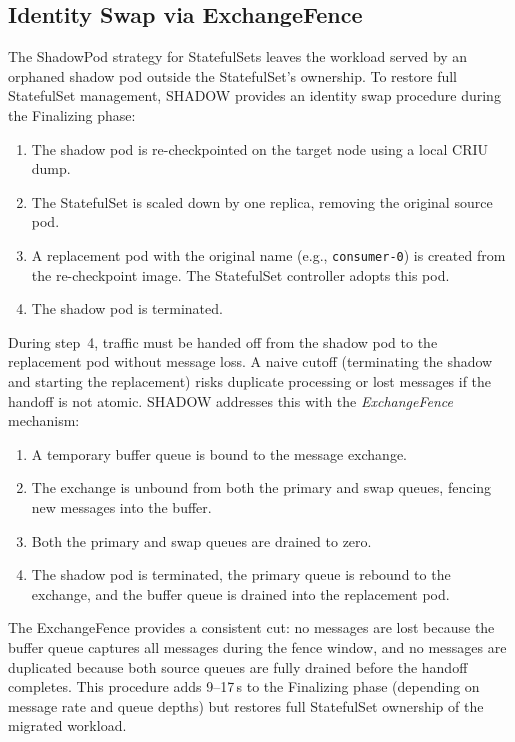 \documentclass[conference]{IEEEtran}
\begin{document}
\subsection{Identity Swap via ExchangeFence}
\label{sec:identity-swap}

The ShadowPod strategy for StatefulSets leaves the workload served by an orphaned shadow pod outside the StatefulSet's ownership. To restore full StatefulSet management, SHADOW provides an identity swap procedure during the Finalizing phase:

\begin{enumerate}
\item The shadow pod is re-checkpointed on the target node using a local CRIU dump.
\item The StatefulSet is scaled down by one replica, removing the original source pod.
\item A replacement pod with the original name (e.g., \texttt{consumer-0}) is created from the re-checkpoint image. The StatefulSet controller adopts this pod.
\item The shadow pod is terminated.
\end{enumerate}

During step~4, traffic must be handed off from the shadow pod to the replacement pod without message loss. A naive cutoff (terminating the shadow and starting the replacement) risks duplicate processing or lost messages if the handoff is not atomic. SHADOW addresses this with the \textit{ExchangeFence} mechanism:

\begin{enumerate}
\item A temporary buffer queue is bound to the message exchange.
\item The exchange is unbound from both the primary and swap queues, fencing new messages into the buffer.
\item Both the primary and swap queues are drained to zero.
\item The shadow pod is terminated, the primary queue is rebound to the exchange, and the buffer queue is drained into the replacement pod.
\end{enumerate}

The ExchangeFence provides a consistent cut: no messages are lost because the buffer queue captures all messages during the fence window, and no messages are duplicated because both source queues are fully drained before the handoff completes. This procedure adds 9--17\,s to the Finalizing phase (depending on message rate and queue depths) but restores full StatefulSet ownership of the migrated workload.
\end{document}
